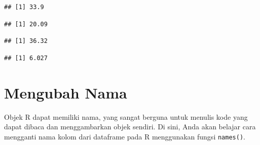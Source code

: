 \documentclass[
]{book}
\newenvironment{Shaded}{\begin{snugshade}}{\end{snugshade}}
\newcommand{\AttributeTok}[1]{\textcolor[rgb]{0.13,0.29,0.53}{#1}}
\newcommand{\CommentTok}[1]{\textcolor[rgb]{0.56,0.35,0.01}{\textit{#1}}}
\newcommand{\ConstantTok}[1]{\textcolor[rgb]{0.56,0.35,0.01}{#1}}
\newcommand{\FunctionTok}[1]{\textcolor[rgb]{0.13,0.29,0.53}{\textbf{#1}}}
\newcommand{\NormalTok}[1]{#1}
\newcommand{\SpecialCharTok}[1]{\textcolor[rgb]{0.81,0.36,0.00}{\textbf{#1}}}
\begin{document}
\begin{verbatim}
## [1] 33.9
\end{verbatim}

\begin{Shaded}
\end{Shaded}

\begin{verbatim}
## [1] 20.09
\end{verbatim}

\begin{Shaded}
\end{Shaded}

\begin{verbatim}
## [1] 36.32
\end{verbatim}

\begin{Shaded}
\end{Shaded}

\begin{verbatim}
## [1] 6.027
\end{verbatim}

\hypertarget{mengubah-nama}{%
\section{Mengubah Nama}\label{mengubah-nama}}

Objek R dapat memiliki nama, yang sangat berguna untuk menulis kode yang dapat dibaca dan menggambarkan objek sendiri. Di sini, Anda akan belajar cara mengganti nama kolom dari dataframe pada R menggunakan fungsi \texttt{names()}.
\end{document}
